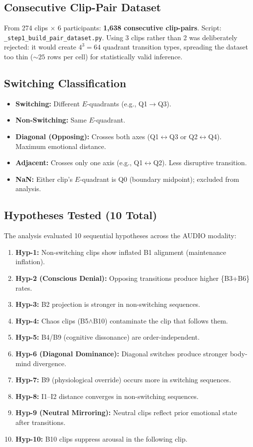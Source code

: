 \documentclass[11pt, a4paper]{report}
\begin{document}
\subsection{Consecutive Clip-Pair Dataset}
From 274 clips $\times$ 6 participants: \textbf{1,638 consecutive clip-pairs}. Script: \texttt{\_step1\_build\_pair\_dataset.py}. Using 3 clips rather than 2 was deliberately rejected: it would create $4^3 = 64$ quadrant transition types, spreading the dataset too thin ($\sim 25$ rows per cell) for statistically valid inference.

\subsection{Switching Classification}
\begin{itemize}
    \item \textbf{Switching:} Different $E$-quadrants (e.g., Q1$\rightarrow$Q3).
    \item \textbf{Non-Switching:} Same $E$-quadrant.
    \item \textbf{Diagonal (Opposing):} Crosses both axes (Q1$\leftrightarrow$Q3 or Q2$\leftrightarrow$Q4). Maximum emotional distance.
    \item \textbf{Adjacent:} Crosses only one axis (e.g., Q1$\leftrightarrow$Q2). Less disruptive transition.
    \item \textbf{NaN:} Either clip's $E$-quadrant is Q0 (boundary midpoint); excluded from analysis.
\end{itemize}

\subsection{Hypotheses Tested (10 Total)}
The analysis evaluated 10 sequential hypotheses across the AUDIO modality:
\begin{enumerate}
    \item \textbf{Hyp-1:} Non-switching clips show inflated B1 alignment (maintenance inflation).
    \item \textbf{Hyp-2 (Conscious Denial):} Opposing transitions produce higher \{B3+B6\} rates.
    \item \textbf{Hyp-3:} B2 projection is stronger in non-switching sequences.
    \item \textbf{Hyp-4:} Chaos clips (B5$\wedge$B10) contaminate the clip that follows them.
    \item \textbf{Hyp-5:} B4/B9 (cognitive dissonance) are order-independent.
    \item \textbf{Hyp-6 (Diagonal Dominance):} Diagonal switches produce stronger body-mind divergence.
    \item \textbf{Hyp-7:} B9 (physiological override) occurs more in switching sequences.
    \item \textbf{Hyp-8:} I1--I2 distance converges in non-switching sequences.
    \item \textbf{Hyp-9 (Neutral Mirroring):} Neutral clips reflect prior emotional state after transitions.
    \item \textbf{Hyp-10:} B10 clips suppress arousal in the following clip.
\end{enumerate}
\end{document}
